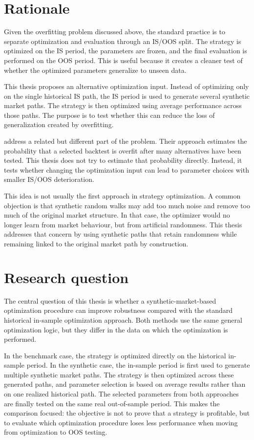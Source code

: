 \section{Rationale}

Given the overfitting problem discussed above, the standard practice is to separate optimization and
evaluation through an IS/OOS split. The strategy is optimized on the IS period, the parameters are
frozen, and the final evaluation is performed on the OOS period. This is useful because it creates a
cleaner test of whether the optimized parameters generalize to unseen data.

This thesis proposes an alternative optimization input. Instead of optimizing only on the single
historical IS path, the IS period is used to generate several synthetic market paths. The strategy is
then optimized using average performance across those paths. The purpose is to test whether this can
reduce the loss of generalization created by overfitting.

\citet{bailey2017} address a related but different part of the problem. Their approach estimates the
probability that a selected backtest is overfit after many alternatives have been tested. This thesis
does not try to estimate that probability directly. Instead, it tests whether changing the
optimization input can lead to parameter choices with smaller IS/OOS deterioration.

This idea is not usually the first approach in strategy optimization. A common objection is that
synthetic random walks may add too much noise and remove too much of the original market structure.
In that case, the optimizer would no longer learn from market behaviour, but from artificial
randomness. This thesis addresses that concern by using synthetic paths that retain randomness while
remaining linked to the original market path by construction.

\section{Research question}

The central question of this thesis is whether a synthetic-market-based optimization procedure can
improve robustness compared with the standard historical in-sample optimization approach. Both
methods use the same general optimization logic, but they differ in the data on which the
optimization is performed.

In the benchmark case, the strategy is optimized directly on the historical in-sample period. In the
synthetic case, the in-sample period is first used to generate multiple synthetic market paths. The
strategy is then optimized across these generated paths, and parameter selection is based on average
results rather than on one realized historical path. The selected parameters from both approaches
are finally tested on the same real out-of-sample period. This makes the comparison focused: the
objective is not to prove that a strategy is profitable, but to evaluate which optimization
procedure loses less performance when moving from optimization to OOS testing.

